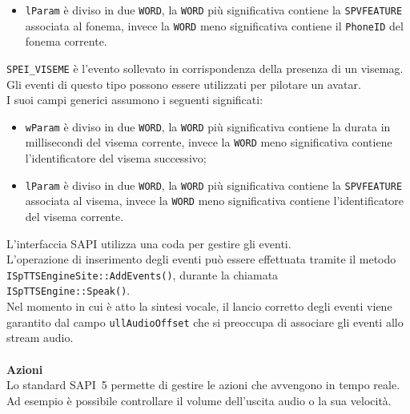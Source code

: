 \begin{description}
\begin{itemize}
		\item \texttt{lParam} è diviso in due \texttt{WORD}, la \texttt{WORD} più significativa contiene la \texttt{SPVFEATURE} associata al fonema, invece la \texttt{WORD} meno significativa contiene il \texttt{PhoneID} del fonema corrente.
	\end{itemize}
	\item [] \texttt{SPEI\_VISEME} è l'evento sollevato in corrispondenza della presenza di un \gls{visemag}. Gli eventi di questo tipo possono essere utilizzati per pilotare un avatar.\\
	I suoi campi generici assumono i seguenti significati:                                                       
	\begin{itemize}                                                                                              
		\item \texttt{wParam} è diviso in due \texttt{WORD}, la \texttt{WORD} più significativa contiene la durata in millisecondi del visema corrente, invece la \texttt{WORD} meno significativa contiene l'identificatore del visema successivo;
		\item \texttt{lParam} è diviso in due \texttt{WORD}, la \texttt{WORD} più significativa contiene la \texttt{SPVFEATURE} associata al visema, invece la \texttt{WORD} meno significativa contiene l'identificatore del visema corrente.
	\end{itemize}                                                                                                
\end{description}                                                                                             
L'interfaccia SAPI utilizza una coda per gestire gli eventi.\\                                                
L'operazione di inserimento degli eventi può essere effettuata tramite il metodo \texttt{ISpTTSEngineSite::AddEvents()}, durante la chiamata \\ \texttt{ISpTTSEngine::Speak()}.\\
Nel momento in cui è atto la sintesi vocale, il lancio corretto degli eventi viene garantito dal campo \texttt{ullAudioOffset} che si preoccupa di associare gli eventi allo stream audio.
\\\\
\textbf{Azioni}\\
Lo standard SAPI~5 permette di gestire le azioni che avvengono in tempo reale. Ad esempio è possibile controllare il volume dell'uscita audio o la sua velocità.
